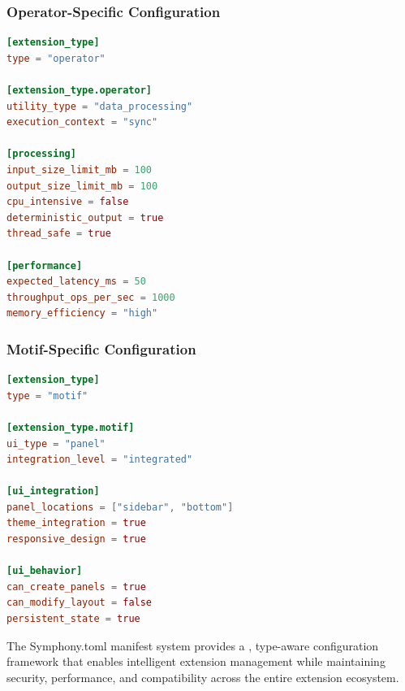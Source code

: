 \subsubsection{Operator-Specific Configuration}
\label{subsubsec:operator-specific-configuration}

\begin{lstlisting}[language=toml,caption=Operator Extension Manifest]
[extension_type]
type = "operator"

[extension_type.operator]
utility_type = "data_processing"
execution_context = "sync"

[processing]
input_size_limit_mb = 100
output_size_limit_mb = 100
cpu_intensive = false
deterministic_output = true
thread_safe = true

[performance]
expected_latency_ms = 50
throughput_ops_per_sec = 1000
memory_efficiency = "high"
\end{lstlisting}

\subsubsection{Motif-Specific Configuration}
\label{subsubsec:motif-specific-configuration}

\begin{lstlisting}[language=toml,caption=Motif Extension Manifest]
[extension_type]
type = "motif"

[extension_type.motif]
ui_type = "panel"
integration_level = "integrated"

[ui_integration]
panel_locations = ["sidebar", "bottom"]
theme_integration = true
responsive_design = true

[ui_behavior]
can_create_panels = true
can_modify_layout = false
persistent_state = true
\end{lstlisting}

The Symphony.toml manifest system provides a , type-aware configuration framework that enables intelligent extension management while maintaining security, performance, and compatibility across the entire extension ecosystem.